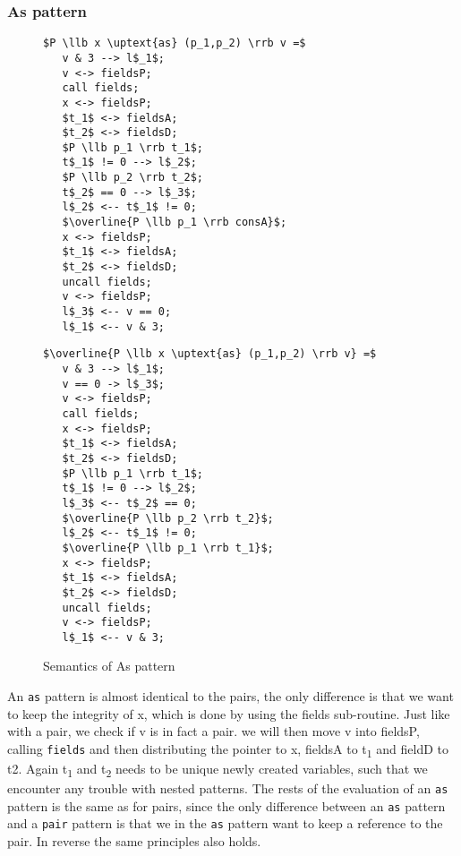 \documentclass[a4paper]{article}
\begin{document}
\subsubsection{As pattern}
\label{sec:org541e4e6}
\begin{figure}[!htb]
\begin{minipage}{0.4\textwidth}
\begin{lstlisting}
$P \llb x \uptext{as} (p_1,p_2) \rrb v =$
   v & 3 --> l$_1$;
   v <-> fieldsP;
   call fields;
   x <-> fieldsP;
   $t_1$ <-> fieldsA;
   $t_2$ <-> fieldsD;
   $P \llb p_1 \rrb t_1$;
   t$_1$ != 0 --> l$_2$;
   $P \llb p_2 \rrb t_2$;
   t$_2$ == 0 --> l$_3$;
   l$_2$ <-- t$_1$ != 0;
   $\overline{P \llb p_1 \rrb consA}$;
   x <-> fieldsP;
   $t_1$ <-> fieldsA;
   $t_2$ <-> fieldsD;
   uncall fields;
   v <-> fieldsP;
   l$_3$ <-- v == 0;
   l$_1$ <-- v & 3;
\end{lstlisting}
\end{minipage}
\qquad
\begin{minipage}{0.4\textwidth}
\begin{lstlisting}
$\overline{P \llb x \uptext{as} (p_1,p_2) \rrb v} =$
   v & 3 --> l$_1$;
   v == 0 -> l$_3$;
   v <-> fieldsP;
   call fields;
   x <-> fieldsP;
   $t_1$ <-> fieldsA;
   $t_2$ <-> fieldsD;
   $P \llb p_1 \rrb t_1$;
   t$_1$ != 0 --> l$_2$;
   l$_3$ <-- t$_2$ == 0;
   $\overline{P \llb p_2 \rrb t_2}$;
   l$_2$ <-- t$_1$ != 0;
   $\overline{P \llb p_1 \rrb t_1}$;
   x <-> fieldsP;
   $t_1$ <-> fieldsA;
   $t_2$ <-> fieldsD;
   uncall fields;
   v <-> fieldsP;
   l$_1$ <-- v & 3;
\end{lstlisting}
\end{minipage}

\caption{Semantics of As pattern}
\label{As}
\end{figure}
An \texttt{as} pattern is almost identical to the pairs, the only difference is that we want to keep the integrity of x, which is done by using the fields sub-routine. Just like with a pair, we check if v is in fact a pair. we will then move v into fieldsP, calling \texttt{fields} and then distributing the pointer to x, fieldsA to t\textsubscript{1} and fieldD to t2. Again t\textsubscript{1} and t\textsubscript{2} needs to be unique newly created variables, such that we encounter any trouble with nested patterns. The rests of the evaluation of an \texttt{as} pattern is the same as for pairs, since the only difference between an \texttt{as} pattern and a \texttt{pair} pattern is that we in the \texttt{as} pattern want to keep a reference to the pair.  In reverse the same principles also holds.
\end{document}

